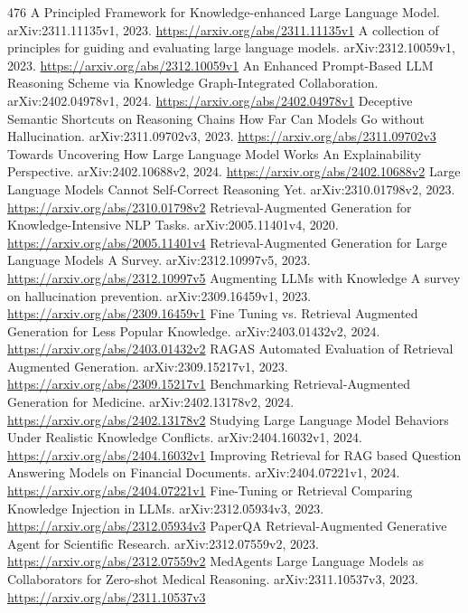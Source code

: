 \documentclass[11pt]{article}
\begin{document}
\begin{thebibliography}{476}
 A Principled Framework for Knowledge-enhanced Large Language Model. arXiv:2311.11135v1, 2023. \url{https://arxiv.org/abs/2311.11135v1}
 A collection of principles for guiding and evaluating large language models. arXiv:2312.10059v1, 2023. \url{https://arxiv.org/abs/2312.10059v1}
 An Enhanced Prompt-Based LLM Reasoning Scheme via Knowledge Graph-Integrated Collaboration. arXiv:2402.04978v1, 2024. \url{https://arxiv.org/abs/2402.04978v1}
 Deceptive Semantic Shortcuts on Reasoning Chains How Far Can Models Go without Hallucination. arXiv:2311.09702v3, 2023. \url{https://arxiv.org/abs/2311.09702v3}
 Towards Uncovering How Large Language Model Works An Explainability Perspective. arXiv:2402.10688v2, 2024. \url{https://arxiv.org/abs/2402.10688v2}
 Large Language Models Cannot Self-Correct Reasoning Yet. arXiv:2310.01798v2, 2023. \url{https://arxiv.org/abs/2310.01798v2}
 Retrieval-Augmented Generation for Knowledge-Intensive NLP Tasks. arXiv:2005.11401v4, 2020. \url{https://arxiv.org/abs/2005.11401v4}
 Retrieval-Augmented Generation for Large Language Models A Survey. arXiv:2312.10997v5, 2023. \url{https://arxiv.org/abs/2312.10997v5}
 Augmenting LLMs with Knowledge A survey on hallucination prevention. arXiv:2309.16459v1, 2023. \url{https://arxiv.org/abs/2309.16459v1}
 Fine Tuning vs. Retrieval Augmented Generation for Less Popular Knowledge. arXiv:2403.01432v2, 2024. \url{https://arxiv.org/abs/2403.01432v2}
 RAGAS Automated Evaluation of Retrieval Augmented Generation. arXiv:2309.15217v1, 2023. \url{https://arxiv.org/abs/2309.15217v1}
 Benchmarking Retrieval-Augmented Generation for Medicine. arXiv:2402.13178v2, 2024. \url{https://arxiv.org/abs/2402.13178v2}
 Studying Large Language Model Behaviors Under Realistic Knowledge Conflicts. arXiv:2404.16032v1, 2024. \url{https://arxiv.org/abs/2404.16032v1}
 Improving Retrieval for RAG based Question Answering Models on Financial Documents. arXiv:2404.07221v1, 2024. \url{https://arxiv.org/abs/2404.07221v1}
 Fine-Tuning or Retrieval Comparing Knowledge Injection in LLMs. arXiv:2312.05934v3, 2023. \url{https://arxiv.org/abs/2312.05934v3}
 PaperQA Retrieval-Augmented Generative Agent for Scientific Research. arXiv:2312.07559v2, 2023. \url{https://arxiv.org/abs/2312.07559v2}
 MedAgents Large Language Models as Collaborators for Zero-shot Medical Reasoning. arXiv:2311.10537v3, 2023. \url{https://arxiv.org/abs/2311.10537v3}

\end{thebibliography}
\end{document}
